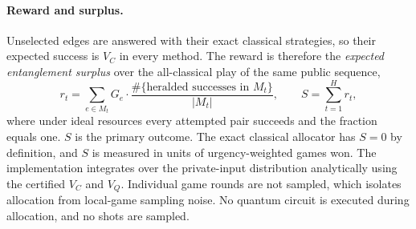 \documentclass[11pt,a4paper]{article}
\begin{document}
\paragraph{Reward and surplus.} Unselected edges are answered with their exact classical strategies, so their expected success is $V_C$ in every method. The reward is therefore the \emph{expected entanglement surplus} over the all-classical play of the same public sequence,
\begin{equation}
  r_t = \sum_{e\in M_t} G_e\cdot\frac{\#\{\text{heralded successes in }M_t\}}{|M_t|},\qquad S=\sum_{t=1}^{H} r_t,
  \label{eq:reward}
\end{equation}
where under ideal resources every attempted pair succeeds and the fraction equals one. $S$ is the primary outcome. The exact classical allocator has $S=0$ by definition, and $S$ is measured in units of urgency-weighted games won. The implementation integrates over the private-input distribution analytically using the certified $V_C$ and $V_Q$. Individual game rounds are not sampled, which isolates allocation from local-game sampling noise. No quantum circuit is executed during allocation, and no shots are sampled.
\end{document}
